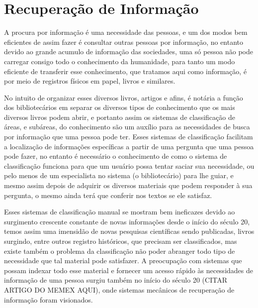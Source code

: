\section{Recuperação de Informação} \label{sec:RecuperaçãoInformação}




A procura por informação é uma necessidade das pessoas, e um dos modos bem eficientes de assim fazer é consultar outras pessoas por informação, no entanto devido ao grande acumulo de informação das sociedades, uma só pessoa não pode carregar consigo todo o conhecimento da humanidade, para tanto um modo eficiente de transferir esse conhecimento, que tratamos aqui como informação, é por meio de registros físicos em papel, livros e similares.

No intuito de organizar esses diversos livros, artigos e afins, é notária a função dos bibliotecários em separar os diversos tipos de conhecimento que os mais diversos livros podem abrir, e portanto assim os sistemas de classificação de áreas, e subáreas, do conhecimento são um auxílio para as necessidades de busca por informação que uma pessoa pode ter. Esses sistemas de classificação facilitam a localização de informações específicas a partir de uma pergunta que uma pessoa pode fazer, no entanto é necessário o conhecimento de como o sistema de classificação funciona para que um usuário possa tentar saciar sua necessidade, ou pelo menos de um especialista no sistema (o bibliotecário) para lhe guiar, e mesmo assim depois de adquirir os diversos materiais que podem responder à sua pergunta, o mesmo ainda terá que conferir nos textos se ele satisfaz.


Esses sistemas de classificação manual se mostram bem ineficazes devido ao surgimento crescente constante de novas informações desde o início do século 20, temos assim uma imensidão de novas pesquisas científicas sendo publicadas, livros surgindo, entre outros registro históricos, que precisam ser classificados, mas existe também o problema da classificação não poder abranger todo tipo de necessidade que tal material pode satisfazer. 
A preocupação com sistemas que possam indexar todo esse material e fornecer um acesso rápido às necessidades de informação de uma pessoa surgiu também no início do século 20 (CITAR ARTIGO DO MEMEX AQUI), onde sistemas mecânicos de recuperação de informação foram visionados.


